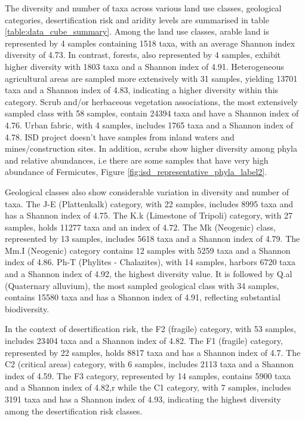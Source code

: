 The diversity and number of taxa across various land use classes, geological categories,
desertification risk and aridity levels are summarised in table \ref{table:data_cube_summary}.
Among the land use classes, arable land is represented by 4 samples containing 1518 taxa,
with an average Shannon index diversity of 4.73. In contrast, forests, also represented by
4 samples, exhibit higher diversity with 1803 taxa and a Shannon index of 4.91.
Heterogeneous agricultural areas are sampled more extensively with 31 samples,
yielding 13701 taxa and a Shannon index of 4.83, indicating a higher diversity
within this category.
Scrub and/or herbaceous vegetation associations,
the most extensively sampled class with 58 samples, contain 24394 taxa and
have a Shannon index of 4.76. Urban fabric, with 4 samples, includes 1765
taxa and a Shannon index of 4.78. ISD project doesn't have samples from inland 
waters and mines/construction sites. In addition, scrubs show higher diversity among 
phyla and relative abundances, i.e there are some samples that have very high abundance of 
Fermicutes, Figure \ref{fig:isd_representative_phyla_label2}.

Geological classes also show considerable variation in diversity and number of taxa.
The J-E (Plattenkalk) category, with 22 samples, includes 8995 taxa and has a Shannon index of 4.75.
The K.k (Limestone of Tripoli) category, with 27 samples, holds 11277 taxa and
an index of 4.72. The Mk (Neogenic) class, represented by 13 samples, includes 5618 taxa and a
Shannon index of 4.79. The Mm.I (Neogenic) category contains 12 samples with 5259 taxa and a Shannon index of 4.86.
Ph-T (Phylites - Chalazites), with 14 samples, harbors 6720 taxa and a Shannon index of 4.92,
the highest diversity value. It is followed by Q.al (Quaternary alluvium), the most sampled
geological class with 34 samples, contains 15580 taxa and has a Shannon index of 4.91, reflecting substantial biodiversity.

In the context of desertification risk, the F2 (fragile) category, with 53 samples,
includes 23404 taxa and a Shannon index of 4.82. The F1 (fragile) category,
represented by 22 samples, holds 8817 taxa and has a Shannon index of 4.7.
The C2 (critical areas) category, with 6 samples, includes 2113 taxa and a Shannon index of 4.59.
The F3 category, represented by 14 samples, contains 5900 taxa and a Shannon index of 4.82,r
while the C1 category, with 7 samples, includes 3191 taxa and has a
Shannon index of 4.93, indicating the highest diversity among the desertification risk classes.

